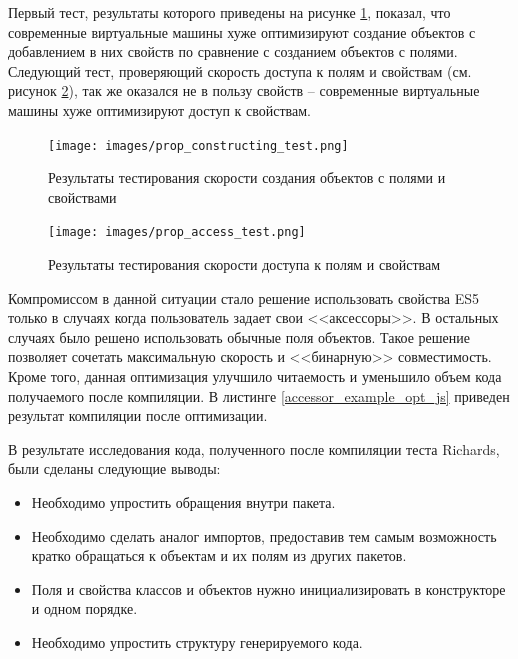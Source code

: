 Первый тест, результаты которого приведены на рисунке \ref{prop_constructing_test}, показал, что современные виртуальные машины хуже оптимизируют создание объектов с добавлением в них свойств по сравнение с созданием объектов с полями. Следующий тест, проверяющий скорость доступа к полям и свойствам (см. рисунок \ref{prop_access_test}), так же оказался не в пользу свойств -- современные виртуальные машины хуже оптимизируют доступ к свойствам.

\begin{figure}[ht!]
\centering
\texttt{[image: images/prop\_constructing\_test.png]}
\caption{Результаты тестирования скорости создания объектов с полями и свойствами}
\label{prop_constructing_test}
\end{figure}

\begin{figure}[ht!]
\centering
\texttt{[image: images/prop\_access\_test.png]}
\caption{Результаты тестирования скорости доступа к полям и свойствам}
\label{prop_access_test}
\end{figure}

Компромиссом в данной ситуации стало решение использовать свойства ES5 только в случаях когда пользователь задает свои <<аксессоры>>. В остальных случаях было решено использовать обычные поля объектов. Такое решение позволяет сочетать максимальную скорость и <<бинарную>> совместимость. Кроме того, данная оптимизация улучшило читаемость и уменьшило объем кода получаемого после компиляции. В листинге \ref{accessor_example_opt_js} приведен результат компиляции после оптимизации.

\begin{code}
\end{code}

В результате исследования кода, полученного после компиляции теста Richards, были сделаны следующие выводы:
\begin{itemize}
\item Необходимо упростить обращения внутри пакета.
\item Необходимо сделать аналог импортов, предоставив тем самым возможность кратко обращаться к объектам и их полям из других пакетов.
\item Поля и свойства классов и объектов нужно инициализировать в конструкторе и одном порядке.
\item Необходимо упростить структуру генерируемого кода.
\end{itemize}


